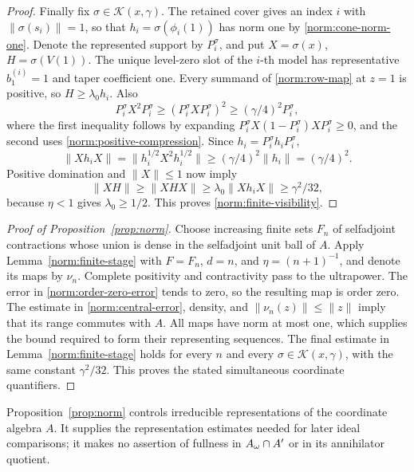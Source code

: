 \begin{proof}
Finally fix \(\sigma\in\mathcal K(x,\gamma)\).  The retained cover
gives an index \(i\) with \(\|\sigma(s_i)\|=1\), so that
\(h_i=\sigma(\phi_i(1))\) has norm one by
\eqref{norm:cone-norm-one}.  Denote the represented support by
\(P_i^\sigma\), and put \(X=\sigma(x)\), \(H=\sigma(V(1))\).
The unique level-zero slot of the \(i\)-th model has representative
\(b_1^{(i)}=1\) and taper coefficient one.  Every summand of
\eqref{norm:row-map} at \(z=1\) is positive, so
\(H\ge\lambda_0 h_i\).  Also
\[
 P_i^\sigma X^2P_i^\sigma
 \ge(P_i^\sigma XP_i^\sigma)^2
 \ge(\gamma/4)^2P_i^\sigma,
\]
where the first inequality follows by expanding
\(P_i^\sigma X(1-P_i^\sigma)XP_i^\sigma\ge0\), and the second
uses \eqref{norm:positive-compression}.
Since \(h_i=P_i^\sigma h_iP_i^\sigma\),
\[
 \|Xh_iX\|
  =\|h_i^{1/2}X^2h_i^{1/2}\|
  \ge(\gamma/4)^2\|h_i\|
  =(\gamma/4)^2 .
\]
Positive domination and \(\|X\|\le1\) now imply
\[
 \|XH\|\ge\|XHX\|
       \ge\lambda_0\|Xh_iX\|
       \ge\gamma^2/32,
\]
because \(\eta<1\) gives \(\lambda_0\ge1/2\).
This proves \eqref{norm:finite-visibility}.
\end{proof}

\begin{proof}[Proof of Proposition~\ref{prop:norm}]
Choose increasing finite sets \(F_n\) of selfadjoint contractions
whose union is dense in the selfadjoint unit ball of \(A\).
Apply Lemma~\ref{norm:finite-stage} with
\(F=F_n\), \(d=n\), and \(\eta=(n+1)^{-1}\), and denote its maps
by \(\nu_n\).  Complete positivity and contractivity pass to the
ultrapower.  The error in \eqref{norm:order-zero-error} tends to
zero, so the resulting map is order zero.  The estimate in
\eqref{norm:central-error}, density, and
\(\|\nu_n(z)\|\le\|z\|\) imply that its range commutes with \(A\).
All maps have norm at most one, which supplies the bound required
to form their representing sequences.  The final estimate in
Lemma~\ref{norm:finite-stage} holds for every \(n\) and every
\(\sigma\in\mathcal K(x,\gamma)\), with the same constant
\(\gamma^2/32\).  This proves the stated simultaneous coordinate
quantifiers.
\end{proof}

\begin{remark}\label{norm:scope}
Proposition~\ref{prop:norm} controls irreducible representations of
the coordinate algebra \(A\).  It supplies the representation
estimates needed for later ideal comparisons; it makes no
assertion of fullness in \(A_\omega\cap A'\) or in its annihilator
quotient.
\end{remark}
